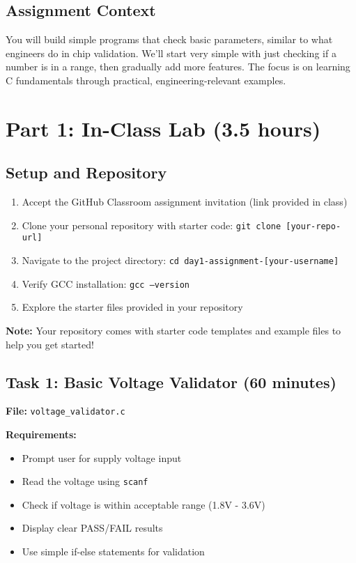 \documentclass[11pt,a4paper]{article}
\begin{document}
\subsection{Assignment Context}
You will build simple programs that check basic parameters, similar to what engineers do in chip validation. We'll start very simple with just checking if a number is in a range, then gradually add more features. The focus is on learning C fundamentals through practical, engineering-relevant examples.

\section{Part 1: In-Class Lab (3.5 hours)}

\subsection{Setup and Repository}
\begin{enumerate}
    \item Accept the GitHub Classroom assignment invitation (link provided in class)
    \item Clone your personal repository with starter code: \texttt{git clone [your-repo-url]}
    \item Navigate to the project directory: \texttt{cd day1-assignment-[your-username]}
    \item Verify GCC installation: \texttt{gcc --version}
    \item Explore the starter files provided in your repository
\end{enumerate}

\textbf{Note:} Your repository comes with starter code templates and example files to help you get started!

\subsection{Task 1: Basic Voltage Validator (60 minutes)}

\textbf{File:} \texttt{voltage\_validator.c}

\textbf{Requirements:}
\begin{itemize}
    \item Prompt user for supply voltage input
    \item Read the voltage using \texttt{scanf}
    \item Check if voltage is within acceptable range (1.8V - 3.6V)
    \item Display clear PASS/FAIL results
    \item Use simple if-else statements for validation
\end{itemize}
\end{document}
